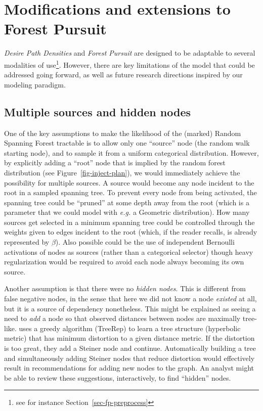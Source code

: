 \documentclass[%
	12pt,
		oneside,
		letterpaper
]{book}
\begin{document}
\section{Modifications and extensions to Forest
Pursuit}\label{sec-future-fp}

\emph{Desire Path Densities} and \emph{Forest Pursuit} are designed to
be adaptable to several modalities of use\footnote{see for instance
  Section~\ref{sec-fp-preprocess}}. However, there are key limitations
of the model that could be addressed going forward, as well as future
research directions inspired by our modeling paradigm.

\subsection{Multiple sources and hidden
nodes}\label{multiple-sources-and-hidden-nodes}

One of the key assumptions to make the likelihood of the (marked) Random
Spanning Forest tractable is to allow only one ``source'' node (the
random walk starting node), and to sample it from a uniform categorical
distribution. However, by explicitly adding a ``root'' node that is
implied by the random forest distribution (see
Figure~\ref{fig-inject-plan}), we would immediately achieve the
possibility for multiple sources. A source would become any node
incident to the root in a sampled spanning tree. To prevent every node
from being activated, the spanning tree could be ``pruned'' at some
depth away from the root (which is a parameter that we could model with
\emph{e.g.} a Geometric distribution). How many sources get selected in
a minimum spanning tree could be controlled through the weights given to
edges incident to the root (which, if the reader recalls, is already
represented by \(\beta\)). Also possible could be the use of independent
Bernoulli activations of nodes as sources (rather than a categorical
selector) though heavy regularization would be required to avoid each
node always becoming its own source.

Another assumption is that there were no \emph{hidden nodes}. This is
different from false negative nodes, in the sense that here we did not
know a node \emph{existed} at all, but it is a source of dependency
nonetheless. This might be explained as seeing a need to \emph{add} a
node so that observed distances between nodes are maximally tree-like.
\autocite{TreeIam_Sonthalia2020} uses a greedy algorithm (TreeRep) to
learn a tree structure (hyperbolic metric) that has minimum distortion
to a given distance metric. If the distortion is too great, they add a
Steiner node and continue. Automatically building a tree and
simultaneously adding Steiner nodes that reduce distortion would
effectively result in recommendations for adding new nodes to the graph.
An analyst might be able to review these suggestions, interactively, to
find ``hidden'' nodes.
\end{document}
